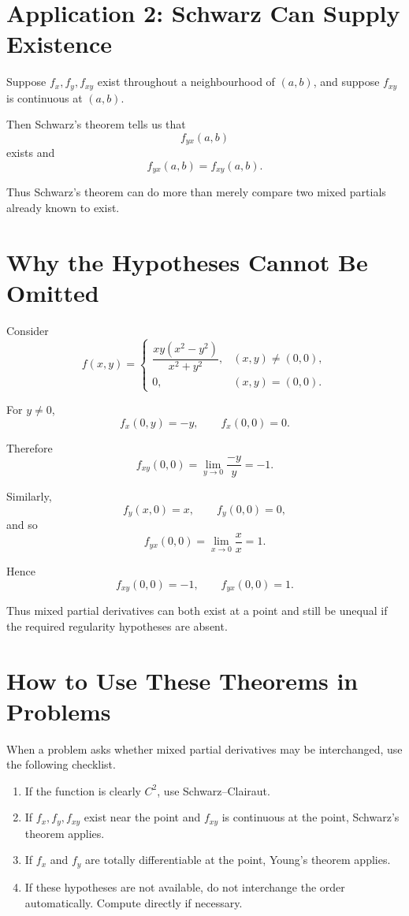 \documentclass[11pt,oneside]{book}
\theoremstyle{studentthm}
\theoremstyle{definition}
\begin{document}
\section{Application 2: Schwarz Can Supply Existence}

Suppose \(f_x,f_y,f_{xy}\) exist throughout a neighbourhood of
\((a,b)\), and suppose \(f_{xy}\) is continuous at \((a,b)\).

Then Schwarz's theorem tells us that
\[
f_{yx}(a,b)
\]
exists and
\[
f_{yx}(a,b)=f_{xy}(a,b).
\]

Thus Schwarz's theorem can do more than merely compare two mixed
partials already known to exist.

\section{Why the Hypotheses Cannot Be Omitted}

Consider
\[
f(x,y)=
\begin{cases}
\dfrac{xy(x^2-y^2)}{x^2+y^2},&(x,y)\ne(0,0),\\[1ex]
0,&(x,y)=(0,0).
\end{cases}
\]

For \(y\ne0\),
\[
f_x(0,y)=-y,
\qquad
f_x(0,0)=0.
\]

Therefore
\[
f_{xy}(0,0)
=
\lim_{y\to0}
\frac{-y}{y}
=-1.
\]

Similarly,
\[
f_y(x,0)=x,
\qquad
f_y(0,0)=0,
\]
and so
\[
f_{yx}(0,0)
=
\lim_{x\to0}
\frac{x}{x}
=1.
\]

Hence
\[
f_{xy}(0,0)=-1,
\qquad
f_{yx}(0,0)=1.
\]

Thus mixed partial derivatives can both exist at a point and still be
unequal if the required regularity hypotheses are absent.

\section{How to Use These Theorems in Problems}

When a problem asks whether mixed partial derivatives may be
interchanged, use the following checklist.

\begin{enumerate}
\item If the function is clearly \(C^2\), use Schwarz--Clairaut.

\item If \(f_x,f_y,f_{xy}\) exist near the point and \(f_{xy}\) is
continuous at the point, Schwarz's theorem applies.

\item If \(f_x\) and \(f_y\) are totally differentiable at the point,
Young's theorem applies.

\item If these hypotheses are not available, do not interchange the
order automatically. Compute directly if necessary.
\end{enumerate}
\end{document}
